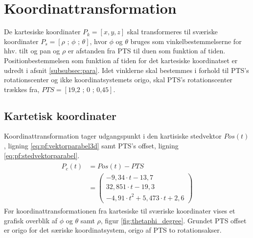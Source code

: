 \section{Koordinattransformation}
\label{sec:koordinattransformation}

De kartesiske koordinater \(P_k=[x, y, z]\) skal transformeres til sværiske koordinater \(P_s=[\rho \text{ ; } \phi \text{ ; } \theta]\), hvor \(\phi\) og \(\theta\) bruges som vinkelbestemmelserne for hhv. tilt og pan og \(\rho\) er afstanden fra PTS til duen som funktion af tiden.
Positionbestemmelsen som funktion af tiden for det kartesiske koordinatset er udredt i afsnit \ref{subsubsec:para}.
Idet vinklerne skal bestemmes i forhold til PTS's rotationscenter og ikke koordinatsystemets origo, skal PTS's rotationscenter trækkes fra, \(PTS=[\text{19,2 ; 0 ; 0,45}]\). 

\subsection{Kartetisk koordinater}
Koordinattransformation tager udgangspunkt i den kartisiske stedvektor \(Pos(t) \), ligning \ref{eq:pf:vektorparabel3d} samt PTS's offset, ligning \ref{eq:pf:stedvektorparabel}.
\begin{align}
\begin{split}
{ P }_{ c }\left( t \right) &=Pos\left( t \right) -PTS
\\
&= \left( \begin{matrix} - 9,34\cdot t-13,7 \\
  32,851\cdot t-19,3 \\ 
 -{ 4,91\cdot t }^{ 2 }+5,473\cdot t+2,6\end{matrix} \right) 
\label{eq:pf:stedvektorparabel}
\end{split}
\end{align}
Før koordinattransformationen fra kartesiske til sværiske koordinater vises et grafisk overblik af \(\phi\) og \(\theta\) samt \(\rho\), figur \ref{fig:thetaphi_degree}. Grundet PTS offset er origo for det særiske koordinatsystem, origo af PTS to rotationsakser. 

